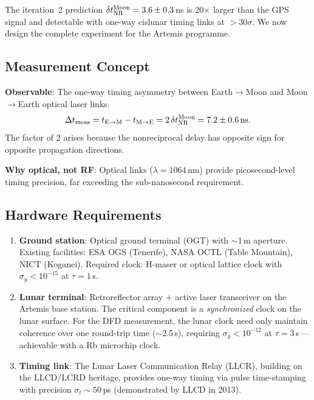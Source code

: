 \documentclass[aps,prd,twocolumn,superscriptaddress]{revtex4-2}
\newcommand{\ns}{\,\mathrm{ns}}
\begin{document}
The iteration~2 prediction $\delta t_{\rm NR}^{\rm Moon} = 3.6\pm0.3$\,ns
is 20$\times$ larger than the GPS signal and detectable with
one-way cislunar timing links at $>30\sigma$.  We now design the
complete experiment for the Artemis programme.

\subsection{Measurement Concept}

\textbf{Observable}: The one-way timing asymmetry between
Earth$\to$Moon and Moon$\to$Earth optical laser links.
\begin{equation}
\Delta t_{\rm meas} = t_{\rm E\to M} - t_{\rm M\to E}
= 2\,\delta t_{\rm NR}^{\rm Moon} = 7.2\pm0.6\ns.
\end{equation}
The factor of 2 arises because the nonreciprocal delay has
opposite sign for opposite propagation directions.

\textbf{Why optical, not RF}: Optical links ($\lambda = 1064$\,nm)
provide picosecond-level timing precision, far exceeding the
sub-nanosecond requirement.

\subsection{Hardware Requirements}

\begin{enumerate}
\item \textbf{Ground station}: Optical ground terminal (OGT) with
$\sim$1\,m aperture. Existing facilities: ESA OGS (Tenerife),
NASA OCTL (Table Mountain), NICT (Koganei). Required clock:
H-maser or optical lattice clock with $\sigma_y < 10^{-15}$
at $\tau = 1$\,s.

\item \textbf{Lunar terminal}: Retroreflector array + active laser
transceiver on the Artemis base station. The critical component
is a \emph{synchronized} clock on the lunar surface. For the DFD
measurement, the lunar clock need only maintain coherence over one
round-trip time ($\sim$2.5\,s), requiring $\sigma_y < 10^{-12}$
at $\tau = 3$\,s\,---\,achievable with a Rb microchip clock.

\item \textbf{Timing link}: The Lunar Laser Communication Relay
(LLCR), building on the LLCD/LCRD heritage, provides one-way
timing via pulse time-stamping with precision $\sigma_t \sim 50$\,ps
(demonstrated by LLCD in 2013).
\end{enumerate}
\end{document}
